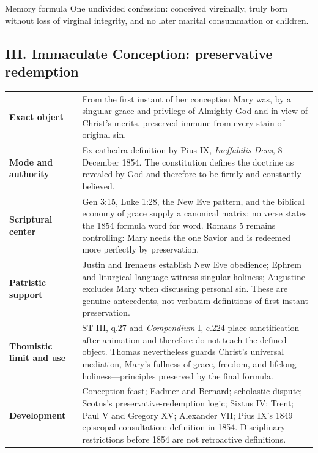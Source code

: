 \begin{studybox}{Memory formula}
One undivided confession: conceived virginally, truly born without loss of virginal integrity, and no later marital consummation or children.
\end{studybox}
\endgroup

\clearpage
\subsection*{III. Immaculate Conception: preservative redemption}
{}

\begingroup
\footnotesize
\renewcommand{\arraystretch}{1.10}
\begin{tabularx}{\textwidth}{@{}>{\raggedright\arraybackslash\bfseries}p{}X@{}}
\toprule
Exact object & From the first instant of her conception Mary was, by a singular grace and privilege of Almighty God and in view of Christ's merits, preserved immune from every stain of original sin.\\
Mode and authority & Ex cathedra definition by Pius IX, \emph{Ineffabilis Deus}, 8 December 1854. The constitution defines the doctrine as revealed by God and therefore to be firmly and constantly believed.\\
Scriptural center & Gen 3:15, Luke 1:28, the New Eve pattern, and the biblical economy of grace supply a canonical matrix; no verse states the 1854 formula word for word. Romans 5 remains controlling: Mary needs the one Savior and is redeemed more perfectly by preservation.\\
Patristic support & Justin and Irenaeus establish New Eve obedience; Ephrem and liturgical language witness singular holiness; Augustine excludes Mary when discussing personal sin. These are genuine antecedents, not verbatim definitions of first-instant preservation.\\
Thomistic limit and use & ST III, q.27 and \emph{Compendium} I, c.224 place sanctification after animation and therefore do not teach the defined object. Thomas nevertheless guards Christ's universal mediation, Mary's fullness of grace, freedom, and lifelong holiness---principles preserved by the final formula.\\
Development & Conception feast; Eadmer and Bernard; scholastic dispute; Scotus's preservative-redemption logic; Sixtus IV; Trent; Paul V and Gregory XV; Alexander VII; Pius IX's 1849 episcopal consultation; definition in 1854. Disciplinary restrictions before 1854 are not retroactive definitions.\\

\end{tabularx}
